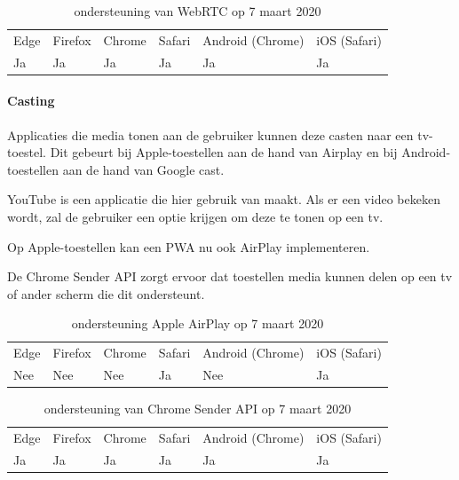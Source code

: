 	\begin{table}[H]
		\centering
		\begin{tabular}{llllll}
			Edge & Firefox & Chrome & Safari & Android (Chrome) & iOS (Safari) \\
			Ja   & Ja      & Ja     & Ja     & Ja               & Ja          
		\end{tabular}	
		\caption{ondersteuning van WebRTC op 7 maart 2020}
	\end{table}
	
	
	
	
	\paragraph{Casting}
	
	Applicaties die media tonen aan de gebruiker kunnen deze casten naar een tv-toestel. Dit gebeurt bij Apple-toestellen aan de hand van Airplay en bij Android-toestellen aan de hand van Google cast.
	
	YouTube is een applicatie die hier gebruik van maakt. Als er een video bekeken wordt, zal de gebruiker een optie krijgen om deze te tonen op een tv.
	
	Op Apple-toestellen kan een PWA nu ook AirPlay implementeren. 
	\autocite{Apple2020a}
	
	De Chrome Sender API \autocite{Developers2020b} zorgt ervoor dat toestellen media kunnen delen op een tv of ander scherm die dit ondersteunt.
	
	\begin{table}[H]
		\centering
		\begin{tabular}{llllll}
			Edge & Firefox & Chrome & Safari & Android (Chrome) & iOS (Safari) \\
			Nee   & Nee      & Nee     & Ja     & Nee               & Ja          
		\end{tabular}	
		\caption{ondersteuning Apple AirPlay op 7 maart 2020}
	\end{table}
	\begin{table}[H]
		\centering
		\begin{tabular}{llllll}
			Edge & Firefox & Chrome & Safari & Android (Chrome) & iOS (Safari) \\
			Ja   & Ja      & Ja     & Ja     & Ja               & Ja          
		\end{tabular}	
		\caption{ondersteuning van Chrome Sender API op 7 maart 2020}
	\end{table}
	
	
	

